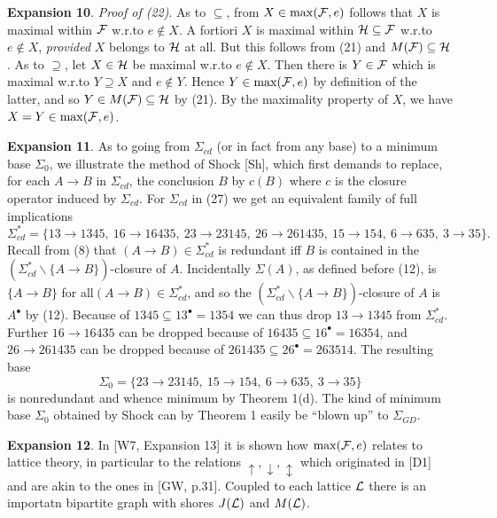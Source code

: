 \documentclass[11pt]{article}
\newcommand{\ra}{\rightarrow}
\begin{document}
{\bf Expansion 10}. {\it Proof of (22)}. As to $\subseteq$, from $X \in \max ({\cal F}, e)$ follows that $X$ is maximal within ${\cal F}$ w.r.to $e \not\in X$. A fortiori $X$ is maximal within ${\cal H} \subseteq {\cal F}$ w.r.to $e \not\in X$, {\it provided} $X$ belongs to ${\cal H}$ at all. But this follows from (21) and $M({\cal F}) \subseteq {\cal H}$. As to $\supseteq$, let $X \in {\cal H}$ be maximal w.r.to $e \not\in X$. Then there is $Y \in {\cal F}$ which is maximal w.r.to $Y \supseteq X$ and $e \not\in Y$. Hence $Y \in \max ({\cal F}, e)$ by definition of the latter, and so $Y \in M({\cal F}) \subseteq {\cal H}$ by (21). By the maximality property of $X$, we have $X = Y \in \max ({\cal F}, e)$.



{\bf Expansion 11}. As to going from $\Sigma_{cd}$ (or in fact from any base) to a minimum base $\Sigma_0$, we illustrate the method of Shock [Sh], which first demands to replace, for each $A \ra B$ in $\Sigma_{cd}$, the conclusion $B$ by $c(B)$ where $c$ is the closure operator induced by $\Sigma_{cd}$. For $\Sigma_{cd}$ in (27) we get an equivalent family of full implications
$$\Sigma^\ast_{cd} = \{13 \ra 1345, \ 16 \ra 16435, \ 23 \ra 23145, \ 26 \ra 261435, \ 15 \ra 154, \ 6 \ra 635,\ 3 \ra 35 \}.$$
Recall from (8) that $(A \ra B) \in \Sigma^\ast_{cd}$ is redundant iff $B$ is contained in the $(\Sigma^\ast_{cd} \backslash \{A \ra B\})$-closure of $A$. Incidentally $\Sigma (A)$, as defined before (12), is $\{A \ra B\}$ for all$(A \ra B) \in \Sigma^\ast_{cd}$, and so the $(\Sigma^\ast_{cd} \backslash \{A \ra B\})$-closure of $A$ is $A^\bullet$ by (12). Because of $1345 \subseteq 13^\bullet = 1354$ we can thus drop $13 \ra 1345$ from $\Sigma^\ast_{cd}$. Further $16 \ra 16435$ can be dropped because of $16435 \subseteq 16^\bullet = 16354$, and $26 \ra 261435$ can be dropped because of $261435 \subseteq 26^\bullet = 263514$. The resulting base
$$\Sigma_0 = \{23 \ra 23145, \ 15 \ra 154, \ 6 \ra 635, \ 3 \ra 35\}$$
is nonredundant and whence minimum by Theorem 1(d). The kind of minimum base $\Sigma_0$ obtained by Shock can by Theorem 1 easily be ``blown up'' to $\Sigma_{GD}$.


{\bf Expansion 12}.  In [W7, Expansion 13] it is shown how $\max ({\cal F}, e)$ relates to lattice theory, in particular to the relations $\uparrow, \downarrow, \updownarrow$ which originated in [D1] and are akin to the ones in [GW, p.31]. Coupled to each lattice ${\cal L}$ there is an importatn bipartite graph with shores $J({\cal L})$ and $M({\cal L})$.
\end{document}
